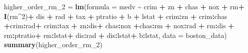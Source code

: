 \documentclass[
]{article}
\newenvironment{Shaded}{\begin{snugshade}}{\end{snugshade}}
\newcommand{\AttributeTok}[1]{\textcolor[rgb]{0.13,0.29,0.53}{#1}}
\newcommand{\DecValTok}[1]{\textcolor[rgb]{0.00,0.00,0.81}{#1}}
\newcommand{\FunctionTok}[1]{\textcolor[rgb]{0.13,0.29,0.53}{\textbf{#1}}}
\newcommand{\NormalTok}[1]{#1}
\newcommand{\OtherTok}[1]{\textcolor[rgb]{0.56,0.35,0.01}{#1}}
\newcommand{\SpecialCharTok}[1]{\textcolor[rgb]{0.81,0.36,0.00}{\textbf{#1}}}
\begin{document}
\begin{Shaded}
\begin{Highlighting}[]
\NormalTok{higher\_order\_rm\_2 }\OtherTok{=} \FunctionTok{lm}\NormalTok{(}\AttributeTok{formula =}\NormalTok{ medv }\SpecialCharTok{\textasciitilde{}}\NormalTok{ crim }\SpecialCharTok{+}\NormalTok{ zn }\SpecialCharTok{+}\NormalTok{ chas }\SpecialCharTok{+}\NormalTok{ nox }\SpecialCharTok{+}\NormalTok{ rm}\SpecialCharTok{+} \FunctionTok{I}\NormalTok{(rm}\SpecialCharTok{\^{}}\DecValTok{2}\NormalTok{)}\SpecialCharTok{+}\NormalTok{ dis }\SpecialCharTok{+}\NormalTok{ rad }\SpecialCharTok{+}\NormalTok{ tax }\SpecialCharTok{+}\NormalTok{ ptratio }\SpecialCharTok{+}\NormalTok{ b }\SpecialCharTok{+}\NormalTok{ lstat }\SpecialCharTok{+}\NormalTok{ crim}\SpecialCharTok{:}\NormalTok{zn }\SpecialCharTok{+}\NormalTok{ crim}\SpecialCharTok{:}\NormalTok{chas  }\SpecialCharTok{+}\NormalTok{crim}\SpecialCharTok{:}\NormalTok{rad}\SpecialCharTok{+}\NormalTok{ crim}\SpecialCharTok{:}\NormalTok{tax }\SpecialCharTok{+}\NormalTok{ zn}\SpecialCharTok{:}\NormalTok{dis}\SpecialCharTok{+}\NormalTok{ chas}\SpecialCharTok{:}\NormalTok{nox }\SpecialCharTok{+}\NormalTok{chas}\SpecialCharTok{:}\NormalTok{rm }\SpecialCharTok{+}\NormalTok{ nox}\SpecialCharTok{:}\NormalTok{rad }\SpecialCharTok{+}\NormalTok{ rm}\SpecialCharTok{:}\NormalTok{dis }\SpecialCharTok{+}\NormalTok{ rm}\SpecialCharTok{:}\NormalTok{ptratio}\SpecialCharTok{+}\NormalTok{ rm}\SpecialCharTok{:}\NormalTok{lstat}\SpecialCharTok{+}\NormalTok{ dis}\SpecialCharTok{:}\NormalTok{rad }\SpecialCharTok{+}\NormalTok{ dis}\SpecialCharTok{:}\NormalTok{lstat}\SpecialCharTok{+}\NormalTok{ b}\SpecialCharTok{:}\NormalTok{lstat, }\AttributeTok{data =}\NormalTok{ boston\_data)}
\FunctionTok{summary}\NormalTok{(higher\_order\_rm\_2)}
\end{Highlighting}
\end{Shaded}
\end{document}
